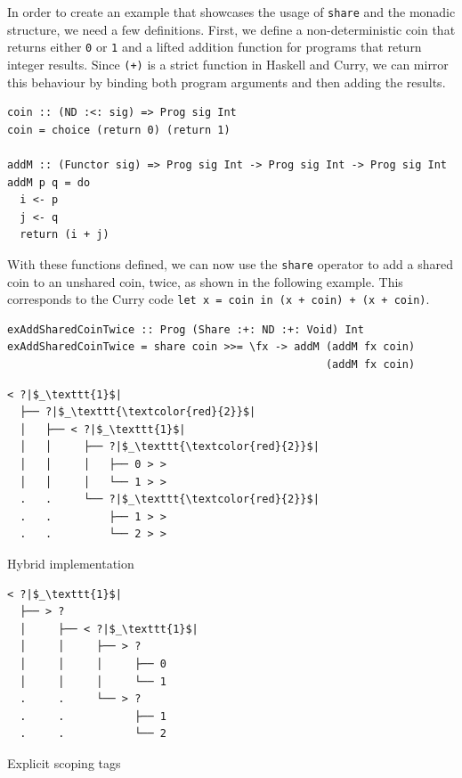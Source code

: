 \documentclass[a4paper, 11pt, fleqn, twoside]{scrreprt}
\newcommand{\hinl}[1]{\texttt{#1}}
\begin{document}
In order to create an example that showcases the usage of \hinl{share} and the monadic structure, we need a few definitions.
First, we define a non-deterministic coin that returns either \hinl{0} or \hinl{1} and a lifted addition function for programs that return integer results.
Since \hinl{(+)} is a strict function in Haskell and Curry, we can mirror this behaviour by binding both program arguments and then adding the results.

\begin{verbatim}
coin :: (ND :<: sig) => Prog sig Int
coin = choice (return 0) (return 1)

addM :: (Functor sig) => Prog sig Int -> Prog sig Int -> Prog sig Int
addM p q = do
  i <- p 
  j <- q 
  return (i + j)
\end{verbatim}

With these functions defined, we can now use the \hinl{share} operator to add a shared coin to an unshared coin, twice, as shown in the following example.
This corresponds to the Curry code \hinl{let x = coin in (x + coin) + (x + coin)}.

\begin{verbatim}
exAddSharedCoinTwice :: Prog (Share :+: ND :+: Void) Int
exAddSharedCoinTwice = share coin >>= \fx -> addM (addM fx coin) 
                                                  (addM fx coin)
\end{verbatim}

\vspace{0.32cm}

\begin{minipage}{.4 \linewidth}
\begin{verbatim}
< ?|$_\texttt{1}$|
  ├── ?|$_\texttt{\textcolor{red}{2}}$|
  │   ├── < ?|$_\texttt{1}$|
  │   │     ├── ?|$_\texttt{\textcolor{red}{2}}$|
  │   │     │   ├── 0 > >
  │   │     │   └── 1 > >
  .   .     └── ?|$_\texttt{\textcolor{red}{2}}$|
  .   .         ├── 1 > >
  .   .         └── 2 > >
\end{verbatim}
\begin{center}
Hybrid implementation
\end{center}
\end{minipage}
\hspace{.1 \linewidth}
\vline
\hspace{.1 \linewidth}
\begin{minipage}{.475 \linewidth}
\begin{verbatim}
< ?|$_\texttt{1}$|
  ├── > ? 
  │     ├── < ?|$_\texttt{1}$|
  │     │     ├── > ? 
  │     │     │     ├── 0
  │     │     │     └── 1
  .     .     └── > ? 
  .     .           ├── 1
  .     .           └── 2
\end{verbatim}
Explicit scoping tags
\end{minipage}
\end{document}
